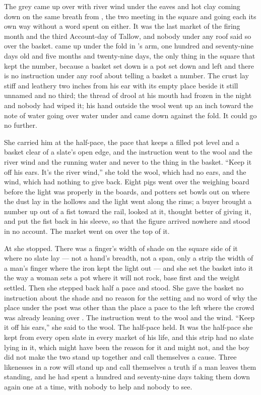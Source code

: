 
The grey came up over  with river wind under the eaves and hot clay coming down on the same breath from , the two meeting in the square and going each its own way without a word spent on either. It was the last market of the firing month and the third Account-day of Tallow, and nobody under any roof said so over the basket.  came up  under the fold in 's arm, one hundred and seventy-nine days old and five months and twenty-nine days, the only thing in the square that kept the number, because a basket set down is a pot set down and left and there is no instruction under any roof about telling a basket a number. The crust lay stiff and leathery two inches from his ear with its empty place beside it still unnamed and no third; the thread of drool at his mouth had frozen in the night and nobody had wiped it; his hand outside the wool went up an inch toward the note of water going over water under  and came down against the fold. It could go no further.

She carried him at the half-pace, the pace that keeps a filled pot level and a basket clear of a slate's open edge, and the instruction went to the wool and the river wind and the running water and never to the thing in the basket. “Keep it off his ears. It's the river wind,” she told the wool, which had no ears, and the wind, which had nothing to give back. Eight pigs went over the weighing board before the light was properly in the boards, and potters set bowls out on  where the dust lay in the hollows and the light went along the rims; a buyer brought a number up out of a fist toward the rail, looked at it, thought better of giving it, and put the fist back in his sleeve, so that the figure arrived nowhere and stood in no account. The market went on over the top of it.

At  she stopped. There was a finger's width of shade on the square side of it where no slate lay --- not a hand's breadth, not a span, only a strip the width of a man's finger where the iron kept the light out --- and she set the basket into it the way a woman sets a pot where it will not rock, base first and the weight settled. Then she stepped back half a pace and stood. She gave the basket no instruction about the shade and no reason for the setting and no word of why the place under the post was other than the place a pace to the left where the crowd was already leaning over . The instruction went to the wool and the wind. “Keep it off his ears,” she said to the wool. The half-pace held. It was the half-pace she kept from every open slate in every market of his life, and this strip had no slate lying in it, which might have been the reason for it and might not, and the boy did not make the two stand up together and call themselves a cause. Three likenesses in a row will stand up and call themselves a truth if a man leaves them standing, and he had spent a hundred and seventy-nine days taking them down again one at a time, with nobody to help and nobody to see.

